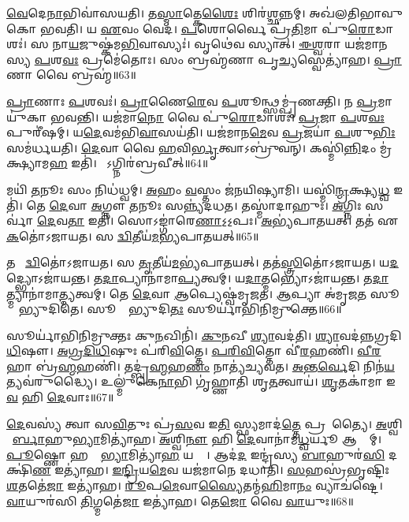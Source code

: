 \ul{𑌵𑍇}𑌦𑍇\ul{𑌨𑌾}𑌭𑌿𑌵𑌾॑𑌸𑌯𑌤𑌿।
𑌤\ul{𑌸𑍍𑌮𑌾}𑌤𑍍𑌕𑍇\ul{𑌶𑍈𑌃} 𑌶𑌿𑌰॑\ul{𑌶𑍍𑌛}𑌨𑍍𑌨𑌮𑍍।
𑌅𑌖॑𑌲𑌤𑌿𑌭𑌾𑌵𑍁𑌕𑍋 𑌭𑌵𑌤𑌿।
𑌯 \ul{𑌏}𑌵𑌂 𑌵𑍇𑌦॑।
\ul{𑌪}𑌶𑍋𑌰𑍍𑌵𑍈 𑌪𑍍𑌰॑\ul{𑌤𑌿}𑌮𑌾 𑌪𑍁॑\ul{𑌰𑍋}𑌡𑌾𑌶𑌃॑।
𑌸 𑌨𑌾\ul{𑌯}𑌜𑍁𑌷𑍍𑌕॑𑌮\ul{𑌭𑌿}𑌵𑌾𑌸𑍍𑌯𑌃॑।
𑌵𑍃𑌥𑍇॑𑌵 𑌸𑍍𑌯𑌾𑌤𑍍।
\ul{𑌈}\ul{𑌶𑍍𑌵}𑌰𑌾 𑌯𑌜॑𑌮𑌾𑌨𑌸𑍍𑌯 \ul{𑌪}𑌶\ul{𑌵𑌃} 𑌪𑍍𑌰𑌮𑍇॑𑌤𑍋𑌃।
𑌸𑌂 𑌬𑍍𑌰𑌹𑍍𑌮॑𑌣𑌾 𑌪𑍃\ul{𑌚𑍍𑌯}𑌸𑍍𑌵𑍇𑌤𑍍𑌯𑌾॑𑌹।
\ul{𑌪𑍍𑌰𑌾}𑌣𑌾 𑌵𑍈 𑌬𑍍𑌰𑌹𑍍𑌮॑॥63॥

\ul{𑌪𑍍𑌰𑌾}𑌣𑌾𑌃 \ul{𑌪}𑌶𑌵𑌃॑।
\ul{𑌪𑍍𑌰𑌾}𑌣𑍈\ul{𑌰𑍇}𑌵 \ul{𑌪}𑌶𑍂𑌨𑍍𑌥𑍍𑌸𑌮𑍍𑌪𑍃॑𑌣𑌕𑍍𑌤𑌿।
𑌨 \ul{𑌪𑍍𑌰}𑌮𑌾𑌯𑍁॑𑌕𑌾 𑌭𑌵𑌨𑍍𑌤𑌿।
𑌯𑌜॑𑌮𑌾\ul{𑌨𑍋} 𑌵𑍈 𑌪𑍁॑\ul{𑌰𑍋}𑌡𑌾𑌶𑌃॑।
\ul{𑌪𑍍𑌰}𑌜𑌾 \ul{𑌪}𑌶\ul{𑌵𑌃} 𑌪𑍁𑌰𑍀॑𑌷𑌮𑍍।
𑌯\ul{𑌦𑍇}𑌵𑌮॑𑌭𑌿\ul{𑌵𑌾}𑌸𑌯॑𑌤𑌿।
𑌯𑌜॑𑌮𑌾𑌨\ul{𑌮𑍇}𑌵 \ul{𑌪𑍍𑌰}𑌜𑌯𑌾॑ \ul{𑌪}𑌶𑍁\ul{𑌭𑌿𑌃} 𑌸𑌮॑𑌰𑍍𑌧𑌯𑌤𑌿।
\ul{𑌦𑍇}𑌵𑌾 𑌵𑍈 \ul{𑌹}𑌵𑌿\ul{𑌰𑍍𑌭𑍃}𑌤𑍍𑌵𑌾\-𑌽𑌬𑍍𑌰𑍁॑𑌵𑌨𑍍।
𑌕𑌸𑍍𑌮𑌿॑\ul{𑌨𑍍𑌨𑌿}𑌦𑌂 𑌮𑍍𑌰॑𑌕𑍍𑌷𑍍𑌯𑌾𑌮\ul{𑌹} 𑌇𑌤𑌿॑।
𑌸𑍋᳚𑌽𑌗𑍍𑌨𑌿𑌰॑𑌬𑍍𑌰𑌵𑍀𑌤𑍍॥64॥

𑌮𑌯𑌿॑ \ul{𑌤}𑌨𑍂𑌃 𑌸𑌂 𑌨𑌿𑌧॑𑌧𑍍𑌵𑌮𑍍।
\ul{𑌅}𑌹𑌂 \ul{𑌵}𑌸𑍍𑌤𑌂 𑌜॑𑌨𑌯𑌿𑌷𑍍𑌯𑌾𑌮𑌿।
𑌯𑌸𑍍𑌮𑌿॑\ul{𑌨𑍍𑌮𑍍𑌰}𑌕𑍍𑌷𑍍𑌯\ul{𑌧𑍍𑌵} 𑌇𑌤𑌿॑।
𑌤𑍇 \ul{𑌦𑍇}𑌵𑌾 \ul{𑌅}𑌗𑍍𑌨𑍗 \ul{𑌤}𑌨𑍂𑌃 𑌸𑌨𑍍𑌨𑍍𑌯॑𑌦𑌧𑌤।
𑌤𑌸𑍍𑌮𑌾॑𑌦𑌾𑌹𑍁𑌃।
\ul{𑌅}𑌗𑍍𑌨𑌿𑌃 𑌸𑌰𑍍𑌵𑌾॑ \ul{𑌦𑍇}𑌵\ul{𑌤𑌾} 𑌇𑌤𑌿॑।
𑌸𑍋𑌽𑌙𑍍𑌗𑌾॑𑌰𑍇\ul{𑌣𑌾}𑌽॒𑌽॒𑌪𑌃।
\ul{𑌅}𑌭𑍍𑌯॑𑌪𑌾𑌤𑌯𑌤𑍍।
𑌤𑌤॑ 𑌏\ul{𑌕}𑌤𑍋॑\-𑌽𑌜𑌾𑌯𑌤।
𑌸 \ul{𑌦𑍍𑌵𑌿}𑌤𑍀𑌯॑\ul{𑌮}𑌭𑍍𑌯॑\-𑌪𑌾𑌤𑌯𑌤𑍍॥65॥

𑌤𑌤𑍋᳚ \ul{𑌦𑍍𑌵𑌿}𑌤𑍋॑\-𑌽𑌜𑌾𑌯𑌤।
𑌸 \ul{𑌤𑍃}𑌤𑍀𑌯॑\ul{𑌮}𑌭𑍍𑌯॑𑌪𑌾𑌤𑌯𑌤𑍍।
𑌤𑌤॑\ul{𑌸𑍍𑌤𑍍𑌰𑌿}𑌤𑍋॑\-𑌽𑌜𑌾𑌯𑌤।
𑌯\ul{𑌦}𑌦𑍍𑌭𑍍𑌯𑍋\-𑌽𑌜𑌾॑𑌯𑌨𑍍𑌤।
𑌤\ul{𑌦𑌾}𑌪𑍍𑌯𑌾𑌨𑌾॑𑌮𑌾\ul{𑌪𑍍𑌯}𑌤𑍍𑌵𑌮𑍍।
𑌯\ul{𑌦𑌾}𑌤𑍍𑌮𑌭𑍍𑌯𑍋\-𑌽𑌜𑌾॑𑌯𑌨𑍍𑌤।
𑌤\ul{𑌦𑌾}𑌤𑍍𑌮𑍍𑌯𑌾𑌨𑌾॑𑌮𑌾\ul{𑌤𑍍𑌮𑍍𑌯}𑌤𑍍𑌵𑌮𑍍।
𑌤𑍇 \ul{𑌦𑍇}𑌵𑌾 \ul{𑌆}𑌪𑍍𑌯𑍇𑌷𑍍𑌵॑𑌮𑍃𑌜𑌤।
\ul{𑌆}𑌪𑍍𑌯𑌾 𑌅॑𑌮𑍃𑌜\ul{𑌤} 𑌸𑍂𑌰𑍍𑌯𑌾᳚𑌭𑍍𑌯𑍁𑌦𑌿𑌤𑍇।
𑌸𑍂𑌰𑍍𑌯𑌾᳚𑌭𑍍𑌯𑍁𑌦𑌿\ul{𑌤𑌃} 𑌸𑍂𑌰𑍍𑌯𑌾॑𑌭𑌿𑌨𑌿𑌮𑍍𑌰𑍁𑌕𑍍𑌤𑍇॥66॥

𑌸𑍂𑌰𑍍𑌯𑌾॑𑌭𑌿𑌨𑌿𑌮𑍍𑌰𑍁𑌕𑍍𑌤𑌃 𑌕𑍁\ul{𑌨}𑌖𑌿𑌨𑌿॑।
\ul{𑌕𑍁}\ul{𑌨}𑌖𑍀 \ul{𑌶𑍍𑌯𑌾}𑌵𑌦॑𑌤𑌿।
\ul{𑌶𑍍𑌯𑌾}𑌵𑌦॑𑌨𑍍𑌨𑌗𑍍𑌰𑌦𑌿\ul{𑌧𑌿}𑌷𑍗।
\ul{𑌅}\ul{𑌗𑍍𑌰}\ul{𑌦𑌿}\ul{𑌧𑌿}𑌷𑍁𑌃 𑌪॑𑌰𑌿\ul{𑌵𑌿}𑌤𑍍𑌤𑍇।
\ul{𑌪}\ul{𑌰𑌿}\ul{𑌵𑌿}𑌤𑍍𑌤𑍋 𑌵𑍀॑\ul{𑌰}𑌹𑌣𑌿॑।
\ul{𑌵𑍀}\ul{𑌰}𑌹𑌾 𑌬𑍍𑌰॑\ul{𑌹𑍍𑌮}𑌹𑌣𑌿॑।
𑌤𑌦𑍍𑌬𑍍𑌰॑\ul{𑌹𑍍𑌮}𑌹\ul{𑌣𑌂} 𑌨𑌾𑌤𑍍𑌯॑𑌚𑍍𑌯𑌵𑌤।
\ul{𑌅}\ul{𑌨𑍍𑌤}\ul{𑌰𑍍𑌵𑍇}𑌦𑌿 𑌨𑌿𑌨॑\ul{𑌯}𑌤𑍍𑌯𑌵॑𑌰𑍁𑌦𑍍𑌧𑍍𑌯𑍈।
𑌉𑌲𑍍𑌮𑍁॑𑌕𑍇\ul{𑌨𑌾}𑌭𑌿 𑌗𑍃॑𑌹𑍍𑌣𑌾𑌤𑌿 𑌶𑍃\ul{𑌤}𑌤𑍍𑌵𑌾𑌯॑।
\ul{𑌶𑍃}𑌤𑌕𑌾॑𑌮𑌾 𑌇\ul{𑌵} 𑌹𑌿 \ul{𑌦𑍇}𑌵𑌾𑌃॥67॥\anuvakamend[\ul{𑌅}𑌨𑍍𑌯𑌾 𑌜𑌿॑𑌨𑍍𑌵𑌨𑍍𑌤𑍍𑌯𑌨𑍁 \ul{𑌵𑌿}𑌸𑍃\ul{𑌤𑍍𑌯𑍈}𑌵\ul{𑌮𑌾}𑌹𑌾𑌶𑌾᳚𑌨𑍍𑌤 𑌆\ul{𑌹} 𑌗𑍁𑌪𑍍𑌤𑍍𑌯𑍈॑ \ul{𑌛}𑌨𑍍𑌨𑌂 𑌬𑍍𑌰𑌹𑍍𑌮𑌾᳚𑌬𑍍𑌰𑌵𑍀\ul{𑌦𑍍𑌦𑍍𑌵𑌿}𑌤𑍀𑌯॑\ul{𑌮}𑌭𑍍𑌯॑𑌪𑌾𑌤\ul{𑌯}𑌥𑍍𑌸𑍂𑌰𑍍𑌯𑌾॑𑌭𑌿𑌨𑌿𑌮𑍍𑌰𑍁𑌕𑍍𑌤𑍇 \ul{𑌦𑍇}𑌵𑌾𑌃]

\ul{𑌦𑍇}𑌵𑌸𑍍𑌯॑ 𑌤𑍍𑌵𑌾 𑌸\ul{𑌵𑌿}𑌤𑍁𑌃 𑌪𑍍𑌰॑\ul{𑌸}𑌵 𑌇\ul{𑌤𑌿} 𑌸𑍍𑌫𑍍𑌯𑌮𑌾𑌦॑\ul{𑌤𑍍𑌤𑍇} 𑌪𑍍𑌰𑌸𑍂᳚𑌤𑍍𑌯𑍈।
\ul{𑌅}𑌶𑍍𑌵𑌿𑌨𑍋᳚\ul{𑌰𑍍𑌬𑌾}𑌹𑍁\ul{𑌭𑍍𑌯𑌾}𑌮𑌿𑌤𑍍𑌯𑌾॑𑌹।
\ul{𑌅}𑌶𑍍𑌵𑌿\ul{𑌨𑍗} 𑌹𑌿 \ul{𑌦𑍇}𑌵𑌾𑌨𑌾॑𑌮\ul{𑌧𑍍𑌵}𑌰𑍍𑌯𑍂 𑌆𑌸𑍍𑌤𑌾᳚𑌮𑍍।
\ul{𑌪𑍂}𑌷𑍍𑌣𑍋 𑌹𑌸𑍍𑌤𑌾᳚\ul{𑌭𑍍𑌯𑌾}𑌮𑌿𑌤𑍍𑌯𑌾॑\ul{𑌹} 𑌯𑌤𑍍𑌯𑍈᳚।
𑌆𑌦॑\ul{𑌦} 𑌇𑌨𑍍𑌦𑍍𑌰॑𑌸𑍍𑌯 \ul{𑌬𑌾}𑌹𑍁𑌰॑\ul{𑌸𑌿} 𑌦𑌕𑍍𑌷𑌿॑\ul{𑌣} 𑌇𑌤𑍍𑌯𑌾॑𑌹।
\ul{𑌇}\ul{𑌨𑍍𑌦𑍍𑌰𑌿}𑌯\ul{𑌮𑍇}𑌵 𑌯𑌜॑𑌮𑌾𑌨𑍇 𑌦𑌧𑌾𑌤𑌿।
\ul{𑌸}𑌹𑌸𑍍𑌰॑𑌭𑍃𑌷𑍍𑌟𑌿𑌃 \ul{𑌶}𑌤𑌤𑍇॑\ul{𑌜𑌾} 𑌇𑌤𑍍𑌯𑌾॑𑌹।
\ul{𑌰𑍂}𑌪\ul{𑌮𑍇}𑌵𑌾\ul{𑌸𑍍𑌯𑍈}𑌤𑌨𑍍𑌮॑\ul{𑌹𑌿}𑌮𑌾\ul{𑌨𑌂} 𑌵𑍍𑌯𑌾𑌚॑𑌷𑍍𑌟𑍇।
\ul{𑌵𑌾}𑌯𑍁𑌰॑𑌸𑌿 \ul{𑌤𑌿}𑌗𑍍𑌮𑌤𑍇॑\ul{𑌜𑌾} 𑌇𑌤𑍍𑌯𑌾॑𑌹।
𑌤𑍇\ul{𑌜𑍋} 𑌵𑍈 \ul{𑌵𑌾}𑌯𑍁𑌃॥68॥

